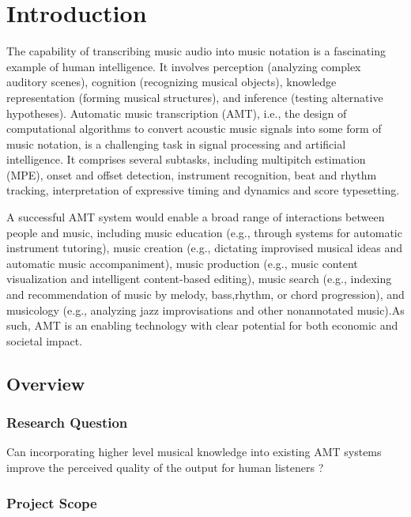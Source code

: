 
\chapter{Introduction}
\vspace{2em}

The capability of transcribing music audio into music notation is a fascinating
example of human intelligence. It involves perception (analyzing complex
auditory scenes), cognition (recognizing musical objects), knowledge
representation (forming musical structures), and inference (testing alternative
hypotheses). Automatic music transcription (AMT), i.e., the design of
computational algorithms to convert acoustic music signals into some form of
music notation, is a challenging task in signal processing and artificial
intelligence. It comprises several subtasks, including multipitch estimation
(MPE), onset and offset detection, instrument recognition, beat and rhythm
tracking, interpretation of expressive timing and dynamics and score
typesetting.
\cite{amt2019:Benetos}

A successful AMT system would enable a broad range of interactions between
people and music, including music education (e.g., through systems for automatic
instrument tutoring), music creation (e.g., dictating improvised musical ideas
and automatic music accompaniment), music production (e.g., music content
visualization and intelligent content-based editing), music search (e.g.,
indexing and recommendation of music by melody, bass,rhythm, or chord
progression), and musicology (e.g., analyzing jazz improvisations and other
nonannotated music).As such, AMT is an enabling technology with clear potential
for both economic and societal impact. \cite{amtfc2013:Benetos}

\section{Overview}

\subsection{Research Question}

Can incorporating higher level musical knowledge into existing AMT systems
improve the perceived quality of the output for human listeners ?

\subsection{Project Scope}

